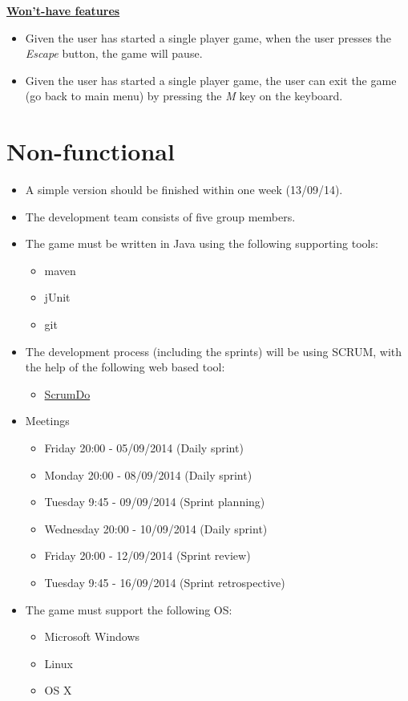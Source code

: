 \documentclass[a4paper,11pt]{article}
\begin{document}
\textbf{\underline{Won't-have features}}
\begin{itemize}
   \item Given the user has started a single player game, when the user presses the \textit{Escape} button, the game will pause.
   \item Given the user has started a single player game, the user can exit the game (go back to main menu) by pressing the \textit{M} key on the keyboard.
\end{itemize}

\newpage
\section*{Non-functional}
\begin{itemize}
  \item A simple version should be finished within one week (13/09/14).
  \item The development team consists of five group members.
  \item The game must be written in Java using the following supporting tools:
  \begin{itemize}
    \item maven
    \item jUnit
    \item git
  \end{itemize}

  \item The development process (including the sprints) will be using SCRUM, with the help of the following web based tool:
  \begin{itemize}
    \item \href{https://www.scrumdo.com/}{ScrumDo}
  \end{itemize}

  \item Meetings
  \begin{itemize}
    \item Friday 20:00 - 05/09/2014 (Daily sprint)
    \item Monday 20:00 - 08/09/2014 (Daily sprint)
    \item Tuesday 9:45 - 09/09/2014 (Sprint planning)
    \item Wednesday 20:00 - 10/09/2014 (Daily sprint)
    \item Friday 20:00 - 12/09/2014 (Sprint review)
    \item Tuesday 9:45 - 16/09/2014 (Sprint retrospective)
  \end{itemize}

  \item The game must support the following OS:
  \begin{itemize}
    \item Microsoft Windows
    \item Linux
    \item OS X
  \end{itemize}
\end{itemize}
\end{document}
